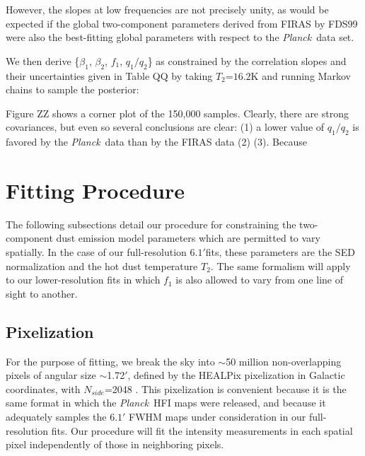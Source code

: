 \documentclass{emulateapj}
\newcommand{\PLANCK}{{\it Planck}}
\begin{document}

However, the slopes at low frequencies are not precisely unity, as would
be expected if the global two-component parameters derived from FIRAS by
FDS99 were also the best-fitting global parameters with respect to the 
\PLANCK~data set.


We then derive \{$\beta_1$, $\beta_2$, $f_1$, $q_1/q_2$\} as constrained by 
the correlation slopes and their uncertainties given in Table QQ by 
taking $T_2$=$16.2$K and running Markov chains to sample the posterior:

Figure ZZ shows a corner plot of the 150,000 samples. Clearly, there are
strong covariances, but even so several conclusions are clear: (1) a lower 
value of $q_1/q_2$ is favored by the \PLANCK~data than by the FIRAS data (2) 
(3). Because





\section{Fitting Procedure}
\label{sec:fitting}

The following subsections detail our procedure for constraining the 
two-component dust emission model parameters which are permitted to vary
spatially. In the case of our full-resolution $6.1'$fits, these parameters
are the SED normalization and the hot dust temperature $T_2$. The same 
formalism will apply to our lower-resolution fits in which $f_1$ is also 
allowed to vary from one line of sight to another.


\subsection{Pixelization}
\label{sec:pix}
For the purpose of fitting, we break the sky into $\sim$50 million 
non-overlapping pixels of angular size $\sim$1.72$'$, defined by the HEALPix 
pixelization in Galactic coordinates, with $N_{side}$=2048 \citep{healpix}. 
This pixelization is convenient because it is the same format in which the 
\PLANCK~HFI maps were released, and because it adequately samples the $6.1'$ 
FWHM maps under consideration in our full-resolution fits. Our procedure will 
fit the intensity measurements in each spatial pixel independently of those in 
neighboring pixels.
\end{document}
